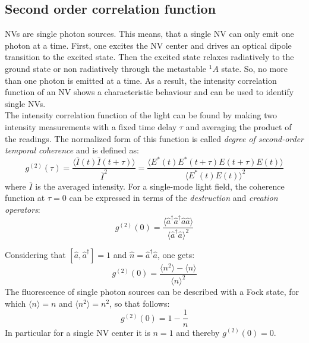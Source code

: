 \documentclass[12pt,a4paper]{article}
\begin{document}
\subsection{Second order correlation function}\label{g2}
NVs are single photon sources. This means, that a single NV can only emit one photon at a time. First, one excites the NV center and drives an optical dipole transition to the excited state. Then the excited state relaxes radiatively to the ground state or non radiatively through the metastable $^1A$ state. So, no more than one photon is emitted at a time. As a result, the intensity correlation function of an NV shows a characteristic behaviour and can be used to identify single NVs. \\
The intensity correlation function of the light can be found by making two intensity measurements with a fixed time delay $\tau$ and averaging the product of the readings. The normalized form of this function is called \textit{degree of second-order temporal coherence} and is defined as:
\begin{equation}
g^{(2)}(\tau)=\frac{\langle\bar{I}(t)\bar{I}(t+\tau)\rangle}{\bar{I}^2}=\frac{\langle E^*(t)E^*(t+\tau)E(t+\tau)E(t)\rangle}{\langle E^*(t)E(t)\rangle^2}
\end{equation}
where $\bar{I}$ is the averaged intensity\cite{qtl}. For a single-mode light field, the coherence function at $\tau =0$ can be expressed in terms of the \textit{destruction} and \textit{creation operators}:
\begin{equation}
g^{(2)}(0)=\frac{\langle \hat{a}^\dag\hat{a}^\dag\hat{a}\hat{a}\rangle}{\langle\hat{a}^\dag\hat{a}\rangle ^2}
\end{equation}

Considering that $[\hat{a},\hat{a}^\dag]=1$ and $\hat{n}=\hat{a}^\dag\hat{a}$, one gets:
\begin{equation}
g^{(2)}(0)=\frac{\langle n^2\rangle -\langle n\rangle}{\langle n\rangle ^2}
\end{equation}
The fluorescence of single photon sources can be described with a Fock state, for which $\langle n\rangle =n$ and $\langle n^2\rangle =n^2$, so that follows:
\begin{equation}
g^{(2)}(0)=1-\frac{1}{n}
\end{equation}
In particular for a single NV center it is $n=1$ and thereby $g^{(2)}(0)=0$.
\end{document}
